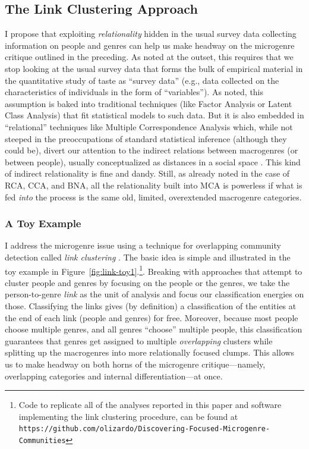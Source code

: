 \documentclass[a4paper,12pt]{extarticle}
\begin{document}
\subsection{The Link Clustering Approach}
I propose that exploiting {\em relationality} hidden in the usual survey data collecting information on people and genres can help us make headway on the microgenre critique outlined in the preceding. As noted at the outset, this requires that we stop looking at the usual survey data that forms the bulk of empirical material in the quantitative study of taste as ``survey data'' (e.g., data collected on the characteristics of individuals in the form of ``variables''). As noted, this assumption is baked into traditional techniques (like Factor Analysis or Latent Class Analysis) that fit statistical models to such data. But it is also embedded in ``relational'' techniques like Multiple Correspondence Analysis which, while not steeped in the preoccupations of standard statistical inference (although they could be), divert our attention to the indirect relations between macrogenres (or between people), usually conceptualized as distances in a social space \citep{flemmen_etal18}. This kind of indirect relationality is fine and dandy. Still, as already noted in the case of RCA, CCA, and BNA, all the relationality built into MCA is powerless if what is fed {\em into} the process is the same old, limited, overextended macrogenre categories. 

\subsubsection{A Toy Example}
I address the microgenre issue using a technique for overlapping community detection called \textit{link clustering} \citep{ahn_etal10}. The basic idea is simple and illustrated in the toy example in Figure~\ref{fig:link-toy1}.\footnote{Code to replicate all of the analyses reported in this paper and software implementing the link clustering procedure, can be found at \nolinkurl{https://github.com/olizardo/Discovering-Focused-Microgenre-Communities}}. Breaking with approaches that attempt to cluster people and genres by focusing on the people or the genres, we take the person-to-genre {\em link} as the unit of analysis and focus our classification energies on those. Classifying the links gives (by definition) a classification of the entities at the end of each link (people and genres) for free. Moreover, because most people choose multiple genres, and all genres ``choose'' multiple people, this classification guarantees that genres get assigned to multiple \textit{overlapping} clusters while splitting up the macrogenres into more relationally focused clumps. This allows us to make headway on both horns of the microgenre critique---namely, overlapping categories and internal differentiation---at once.
\end{document}
